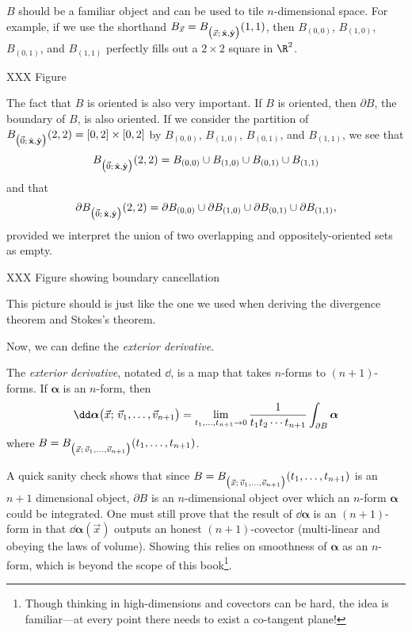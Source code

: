 $B$ should be a familiar object and can be used to tile $n$-dimensional space.
For example, if we use the shorthand $B_{\vec x} = B_{\big(\vec x;\, {\hat {\mathbf x}},{\hat {\mathbf y}}\big)}(1,1)$,
then
$B_{(0,0)}$, $B_{(1,0)}$, $B_{(0,1)}$,
and $B_{(1,1)}$ perfectly fills out a $2\times 2$ square in $\R^2$.

XXX Figure

The fact that $B$ is oriented is also very important.  If $B$ is
oriented, then $\partial B$, the boundary of $B$, is also oriented.
If we consider the partition of 
$B_{\big(\vec 0;\, {\hat {\mathbf x}},{\hat {\mathbf y}}\big)}(2,2)=[0,2]\times[0,2]$ by 
$B_{(0,0)}$, $B_{(1,0)}$, $B_{(0,1)}$,
and $B_{(1,1)}$, we see that
\[
	B_{\big(\vec 0;\, {\hat {\mathbf x}},{\hat {\mathbf y}}\big)}(2,2)
	=B_{(0,0)}\cup B_{(1,0)}\cup B_{(0,1)}\cup B_{(1,1)}
\]
and that
\[
	\partial B_{\big(\vec 0;\, {\hat {\mathbf x}},{\hat {\mathbf y}}\big)}(2,2)=\partial B_{(0,0)}\cup \partial B_{(1,0)}\cup \partial B_{(0,1)}\cup \partial B_{(1,1)},
\]
provided we interpret the union of two overlapping and oppositely-oriented sets as empty.

XXX Figure showing boundary cancellation

This picture should is just like the one we used when deriving the divergence theorem
and Stokes's theorem.


Now, we can define the \emph{exterior derivative}.
\begin{definition}
	The \emph{exterior derivative}, notated $\dd$, is a map that
	takes $n$-forms to $(n+1)$-forms.  If $\bm\alpha$ is an $n$-form,
	then
	\[
		\dd \bm\alpha\formarg{\vec x}{\vec v_1,\ldots,\vec v_{n+1}}
		=\lim_{t_1,\ldots,t_{n+1}\to 0}
		\frac{1}{t_1t_2\cdots t_{n+1}}\int_{\partial B} \bm \alpha
	\]
	where $B = B_{\big(\vec x;\, \vec v_1,\ldots,\vec v_{n+1}\big)}(t_1,\ldots, t_{n+1})$.
\end{definition}

A quick sanity check shows that since $B = B_{\big(\vec x;\, \vec v_1,\ldots,\vec v_{n+1}\big)}(t_1,\ldots, t_{n+1})$
is an $n+1$ dimensional object, $\partial B$ is an $n$-dimensional object over which an $n$-form $\bm\alpha$ could be
integrated.  One must still prove that the result of $\dd\bm\alpha$ is an $(n+1)$-form
in that $\dd \bm\alpha(\vec x)$ outputs an honest $(n+1)$-covector (multi-linear
and obeying the laws of volume).  Showing this relies on smoothness of $\bm\alpha$
as an $n$-form, which is beyond the scope of this book\footnote{
Though thinking in high-dimensions and covectors can be hard, the
idea is familiar---at every point there needs to exist a co-tangent plane!}.

